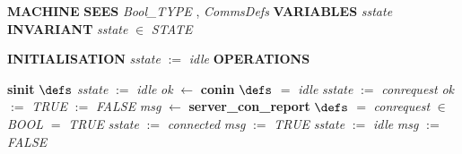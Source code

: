 %
\bsetindent
\begin{tabbing}
\bSetTabs
%
%
\bbnl
{\bf MACHINE} \bhsp{} \-\label{Server}
%
%
\bbnl
{\bf SEES} \+ \bbnl
{\em Bool\_TYPE\/}\label{Bool_TYPE}  , {\em CommsDefs\/}\label{CommsDefs}  \-
%
%
\bbnl
{\bf VARIABLES} \+ \bbnl
{\em sstate\/}\label{sstate}  \-
%
%
\bbnl
{\bf INVARIANT} \+ \bbnl
{\em sstate\/} $\in$ {\em STATE\/}\label{STATE}
\end{tabbing}
\bresetindent
%
%
\vspace{-4.5ex}\bsetindent
\begin{tabbing}
\bSetTabs
\+\> \-
%
%
\bbnl
{\bf INITIALISATION} \+ \bbnl
{\em sstate\/} $:=$  {\em idle\/} \-
%
%
\bnl\bnl
{\bf OPERATIONS} \+ \bbnl

%
%
{\bf { sinit}}  \bhsp $\defs$ \+ \bnl
{\em sstate\/} $:=$  {\em idle\/} \- \bOperationSemiColon \bbnl
%
%
{\em ok\/} $\longleftarrow$  {\bf { conin}}  \bhsp $\defs$ \+ \bnl
   $=$ {\em idle\/} \- \bhsp {} \+\bnl
{\em sstate\/} $:=$  {\em conrequest\/} \bparallel \bnl
{\em ok\/} $:=$  {\em TRUE\/} \-\bnl
{}  $:=$  {\em FALSE\/} \-\bnl
{}  \- \bOperationSemiColon \bbnl
%
%
{\em msg\/} $\longleftarrow$  {\bf { server\_con\_report}}  \bhsp $\defs$ \+ \bnl
   $=$ {\em conrequest\/} \- \bhsp {} \+\bnl
{}  \-\bnl
{}  $\in$ {\em BOOL\/}\label{BOOL}  \- \bhsp {} \+\bnl
{}  $=$ {\em TRUE\/} \- \bhsp {} \+\bnl
{\em sstate\/} $:=$  {\em connected\/} \bparallel \bnl
{\em msg\/} $:=$  {\em TRUE\/} \-\bnl
{} \+\bnl
{\em sstate\/} $:=$  {\em idle\/} \bparallel \bnl
{\em msg\/} $:=$  {\em FALSE\/} \-\bnl
{}  \-\bnl
{}  \-\bnl
{}  \-
\end{tabbing}
